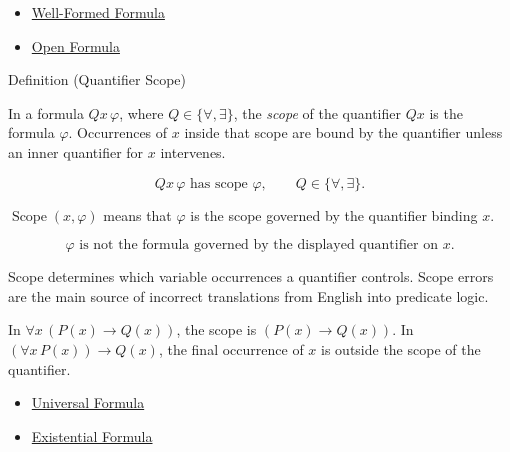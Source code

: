 \begin{dependencies}
\begin{itemize}
  \item \hyperref[def:wff-pred]{Well-Formed Formula}
  \item \hyperref[def:predicate]{Open Formula}
\end{itemize}
\end{dependencies}

\begin{definitionbox}{Definition (Quantifier Scope)}
\begin{definition}
\label{def:quantifier-scope}
In a formula \(Qx\,\varphi\), where \(Q\in\{\forall,\exists\}\), the
\emph{scope} of the quantifier \(Qx\) is the formula \(\varphi\). Occurrences
of \(x\) inside that scope are bound by the quantifier unless an inner
quantifier for \(x\) intervenes.
\end{definition}
\end{definitionbox}

\begin{remark*}
\[
Qx\,\varphi \text{ has scope } \varphi,
\qquad
Q\in\{\forall,\exists\}.
\]
\end{remark*}

\begin{remark*}
\(\operatorname{Scope}(x,\varphi)\) means that \(\varphi\) is the scope governed
by the quantifier binding \(x\).
\end{remark*}

\begin{remark*}
\[
\varphi \text{ is not the formula governed by the displayed quantifier on } x.
\]
\end{remark*}

\begin{remark*}[Interpretation]
Scope determines which variable occurrences a quantifier controls. Scope errors
are the main source of incorrect translations from English into predicate
logic.
\end{remark*}

\begin{remark*}[Examples]
In \(\forall x\,(P(x)\to Q(x))\), the scope is \((P(x)\to Q(x))\). In
\((\forall x\,P(x))\to Q(x)\), the final occurrence of \(x\) is outside the
scope of the quantifier.
\end{remark*}

\begin{dependencies}
\begin{itemize}
  \item \hyperref[def:universal-q]{Universal Formula}
  \item \hyperref[def:existential-q]{Existential Formula}
\end{itemize}
\end{dependencies}

